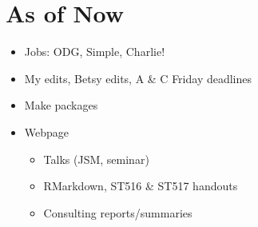 \documentclass{article}
\begin{document}
\section*{As of Now}
\begin{itemize}
\item Jobs: ODG, Simple, Charlie!
\item My edits, Betsy edits, A \& C Friday deadlines
\item Make packages
\item Webpage
  \begin{itemize}
  \item Talks (JSM, seminar)
  \item RMarkdown, ST516 \& ST517 handouts
  \item Consulting reports/summaries
  \end{itemize}
\end{itemize}

% 

\end{document}
